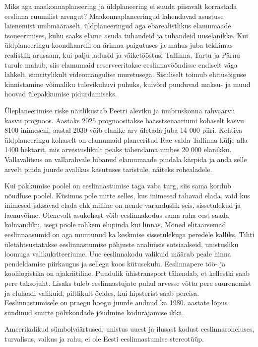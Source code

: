 \documentclass[estonian,]{article}
\begin{document}
Miks aga maakonnaplaneering ja üldplaneering ei suuda piisavalt korrastada eeslinna ruumilist arengut? Maakonnaplaneeringud lahendavad asustuse laienemist umbmääraselt, üldplaneeringud aga ebarealistlikus elamumaade tsoneerimises, kuhu saaks elama asuda tuhandeid ja tuhandeid uuselanikke. Kui üldplaneeringu koondkaardil on ärimaa paigutuses ja mahus juba tekkimas realistlik arusaam, kui palju ladusid ja väiketööstusi Tallinna, Tartu ja Pärnu turule mahub, siis elamumaid reserveeritakse eeslinnavööndisse endiselt väga lahkelt, simcitylikult videomängulise muretusega. Sisuliselt toimub ehitusõiguse kinnistamine võimaliku tulevikuhuvi puhuks, kuivõrd puuduvad maksu- ja muud hoovad ülepakkumise pidurdamiseks.

Üleplaneerimise riske näitlikustab Peetri aleviku ja ümbruskonna rahvaarvu kasvu prognoos. Aastaks 2025 prognoositakse baasstsenaariumi kohaselt kasvu 8100 inimeseni, aastal 2030 võib elanike arv ületada juba 14 000 piiri. Kehtiva üldplaneeringu kohaselt on elamumaid planeeritud Rae valda Tallinna külje alla 1400 hektarit, mis arvestuslikult peaks tähendama umbes 20 000 elanikku. Vallavalitsus on vallarahvale lubanud elamumaade pindala kärpida ja anda selle arvelt pinda juurde avalikus kasutuses taristule, näiteks rohealadele.

Kui pakkumise poolel on eeslinnastumise taga vaba turg, siis sama kordub nõudluse poolel. Küsimus pole mitte selles, kus inimesed tahavad elada, vaid kus inimesed jaksavad elada ehk milline on nende varanduslik seis, sissetulekud ja laenuvõime. Olenevalt asukohast võib eeslinnakodus sama raha eest saada kolmandiku, isegi poole rohkem elupinda kui linnas. Mõned elitaarsemad eeslinnaasumid on aga muutunud ka keskmise sissetulekuga peredele kalliks. Tihti ületähtsustatakse eeslinnastumise põhjuste analüüsis sotsiaalseid, unistusliku loomuga valikukriteeriume. Uue eeslinnakodu valikuid määrab peale hinna pendeldamise piirkaugus ja sellega koos kütusekulu. Eeslinnapere töö- ja koolilogistika on ajakriitiline. Puudulik ühistransport tähendab, et kellestki saab pere taksojuht. Lisaks tuleb eeslinnastujate puhul arvesse võtta pere suurenemist ja elulaadi valikuid, piltlikult öeldes, kui hipsterist saab pereisa. Eeslinnastumisele on praegu hoogu juurde andnud ka 1980. aastate lõpus sündinud suurte põlvkondade jõudmine kodurajamise ikka.

\begin{blockquote-left}
Ameerikalikud sümbolväärtused, unistus uuest ja ilusast kodust
eeslinnaroheluses, turvalisus, vaikus ja rahu, ei ole Eesti
eeslinnastumise stereotüüp.
\end{blockquote-left}
\end{document}
